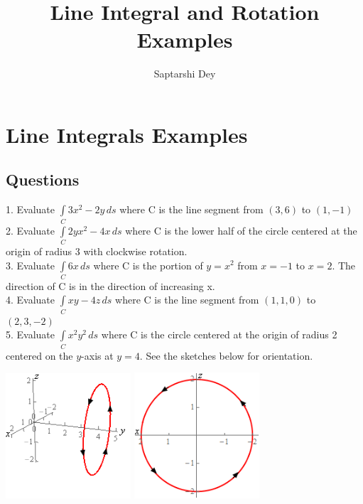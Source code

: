 \documentclass[14pt]{article}
\begin{document}
	\title{Line Integral and Rotation Examples}
	\author{Saptarshi Dey}
	\maketitle
	\section{Line Integrals Examples}
	\subsection{Questions}
	\large{
		1. Evaluate $\displaystyle \int\limits_{C}{{3{x^2} - 2y \,ds}}$ where C is the line segment from $\left( {3,6} \right)$ to $\left( {1,-1} \right)$}
	\\ \large{
		2. Evaluate $\displaystyle \int\limits_{C}{{2y{x^2} - 4x\,ds}}$ where C is the lower half of the circle centered at the origin of radius 3 with clockwise rotation.}
	\\ \large{
		3. Evaluate $\displaystyle \int\limits_{C}{{6x\,ds}}$ where C is the portion of $y = {x^2}$ from $x=-1$ to $x=2$. The direction of C is in the direction of increasing x.}
	\\ \large{
		4. Evaluate $\displaystyle \int\limits_{C}{{xy - 4z\,ds}}$ where C is the line segment from $\left( {1,1,0} \right)$ to $\left( {2,3,-2} \right)$}
	\\ \large{
		5. Evaluate $\displaystyle \int\limits_{C}{{{x^2}{y^2}\,ds}}$ where C is the circle centered at the origin of radius 2 centered on the $y$-axis at $y=4$. See the sketches below for orientation.}
	\\ \begin{center}
		\includegraphics[width=0.35\textwidth]{"./Pictures/Q5_1.png"}
		\includegraphics[width=0.35\textwidth]{"./Pictures/Q5_2.png"}
	\end{center}
\end{document}
